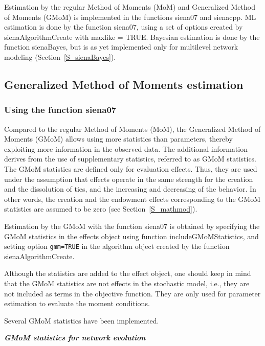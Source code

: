 \documentclass[a4paper,fleqn,11pt]{article}
\newcommand{\+}{\, + \,}
\newcommand{\sfn}[1]{\textsf{#1}}
\begin{document}
Estimation by the regular Method of Moments (MoM)
and Generalized Method of Moments (GMoM)
is implemented in the functions \sfn{siena07} and \sfn{sienacpp}.
ML estimation is done by the function \sfn{siena07}, using a set of options
created by \sfn{sienaAlgorithmCreate} with \sfn{maxlike = TRUE}.
Bayesian estimation is done by the function \sfn{sienaBayes},
but is as yet implemented only for multilevel network modeling
(Section~\ref{S_sienaBayes}).


\subsection{Generalized Method of Moments estimation}
\label{S_GMoM}

\subsubsection{Using the function \sfn{siena07}}
\label{S_GMoM_siena07}


Compared to the regular Method of Moments (MoM), the Generalized Method of
Moments (GMoM) allows using more statistics than parameters,
thereby exploiting more information in the observed data.
The additional information derives from the use of supplementary statistics,
referred to as GMoM statistics. The GMoM statistics are defined only for
evaluation effects. Thus, they are used under the assumption that
effects operate in the same strength for the creation and the dissolution of ties,
and the increasing and decreasing of the behavior. In other words,
the creation and the endowment effects
corresponding to the GMoM statistics are assumed to be zero
(see Section~\ref{S_mathmod}).
\medskip

Estimation by the GMoM with the function \sfn{siena07} is obtained
by specifying the GMoM statistics in the effects object using
function \sfn{includeGMoMStatistics},
and setting option \texttt{gmm=TRUE}
in the algorithm object created by the function \sfn{sienaAlgorithmCreate}.

Although the statistics are added to the effect object,
one should keep in mind that the GMoM statistics are not effects
in the stochastic model, i.e., they are not
included as terms in the objective function.
They are only used for parameter estimation to evaluate the moment conditions.

Several GMoM statistics have been implemented.
\bigskip

\noindent
\textbf{\emph{GMoM statistics for network evolution }}
\medskip
\end{document}
